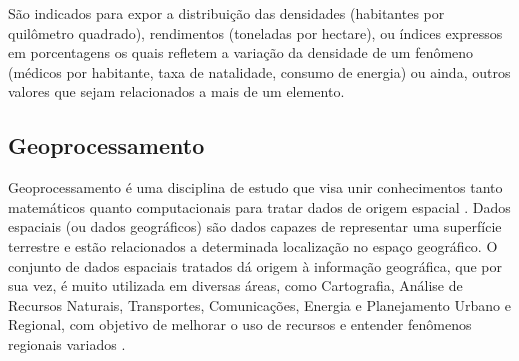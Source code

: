 \documentclass[12pt]{article}
\begin{document}

São indicados para expor a distribuição das densidades (habitantes por quilômetro quadrado), rendimentos (toneladas por hectare), ou índices expressos em porcentagens os quais refletem a variação da densidade de um fenômeno (médicos por habitante, taxa de natalidade, consumo de energia) ou ainda, outros valores que sejam relacionados a mais de um elemento.

\subsection{Geoprocessamento}

Geoprocessamento é uma disciplina de estudo que visa unir conhecimentos tanto matemáticos quanto computacionais para tratar dados de origem espacial \citep{sig}. Dados espaciais (ou dados geográficos) são dados capazes de representar uma superfície terrestre e estão relacionados a determinada localização no espaço geográfico. O conjunto de dados espaciais tratados dá origem à informação geográfica, que por sua vez, é muito utilizada em diversas áreas, como Cartografia, Análise de Recursos Naturais, Transportes, Comunicações, Energia e Planejamento Urbano e Regional, com objetivo de melhorar o uso de recursos e entender fenômenos regionais variados \citep{introci}.
\end{document}
